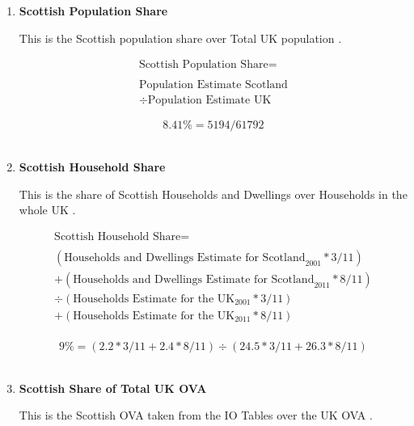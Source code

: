 \begin{enumerate}
\item \textbf {Scottish Population Share}

This is the Scottish population share over Total UK population \cite{ONS2011a}.

\begin{equation}
\begin{split}
\text{Scottish Population Share} =  \\ \\
\text{Population Estimate Scotland}\\
\div \text{Population Estimate UK}
\end{split} \label{eq:2.5.81}
\end{equation}

\begin{equation} \nonumber
8.41\% = 5194/61792
\end{equation}\\


\item \textbf {Scottish Household Share}

This is the share of Scottish Households and Dwellings over Households in the whole UK \cite{ONS2012}.

\begin{equation}
\begin{split}
\text{Scottish Household Share} =  \\ \\
(\text{Households and Dwellings Estimate for Scotland}_\text{2001}*3/11)\\
+(\text{Households and Dwellings Estimate for Scotland}_\text{2011}*8/11)\\
\div (\text{Households Estimate for the UK}_\text{2001}*3/11)\\
+(\text{Households Estimate for the UK}_\text{2011}*8/11)\\
\end{split} \label{eq:2.5.82}
\end{equation}

\begin{equation} \nonumber
9\% = (2.2*3/11 + 2.4*8/11) \div (24.5*3/11 + 26.3*8/11)
\end{equation}\\


\item \textbf {Scottish Share of Total UK OVA}

This is the Scottish OVA taken from the IO Tables \cite{ScottishGovernment2013a} over the UK OVA \cite{ONS2011c}.


\end{enumerate}
